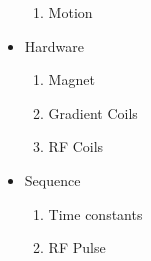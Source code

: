 \begin{itemize}
\begin{enumerate}
    \item Motion
\end{enumerate}


\item{Hardware}
\begin{enumerate}
    \item Magnet
    
    \item Gradient Coils
    
    \item RF Coils
\end{enumerate}


\item{Sequence}
\begin{enumerate}
    \item Time constants
    
    \item RF Pulse 
        

\end{enumerate}
\end{itemize}
